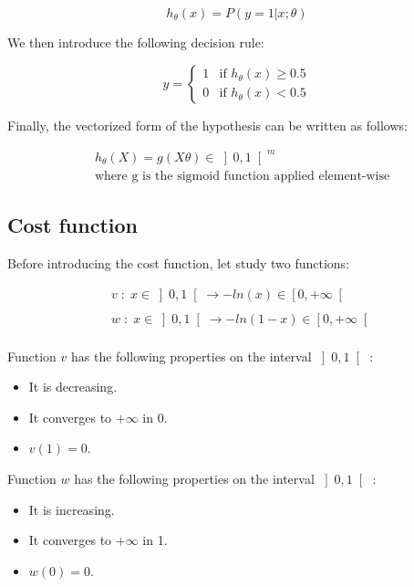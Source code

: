 \documentclass[a4paper, 12pt]{article}
\begin{document}
\begin{equation}
h_{\theta}(x) = P\left(y=1|x;\theta \right)
\end{equation}

We then introduce the following decision rule:

\begin{equation}
y = 
\begin{cases}
1 & \text{if } h_{\theta}(x) \geq 0.5 \\
0 & \text{if } h_{\theta}(x) < 0.5
\end{cases}
\end{equation}

Finally, the vectorized form of the hypothesis can be written as follows:

\begin{align*}
& h_{\theta}(X) = g\left(X\theta\right) \in \left]0, 1\right[^{m} \\
& \text{where g is the sigmoid function applied element-wise}
\end{align*}

\subsection{Cost function}

Before introducing the cost function, let study two functions:

\begin{align*}
& v \; : \; x \in \left] 0, 1 \right[ \longrightarrow  -ln(x) \in \left[0, +\infty\right[ \\
& \\
& w \; : \; x \in \left] 0, 1 \right[ \longrightarrow  -ln(1-x) \in \left[0, +\infty\right[ \\
\end{align*}

Function $v$ has the following properties on the interval $\left] 0, 1 \right[$ :

\begin{itemize}
\item It is decreasing.
\item It converges to $+\infty$ in 0.
\item $v(1)=0$.
\end{itemize}

Function $w$ has the following properties on the interval $\left] 0, 1 \right[$ :

\begin{itemize}
\item It is increasing.
\item It converges to $+\infty$ in 1.
\item $w(0)=0$.
\end{itemize}
\end{document}
